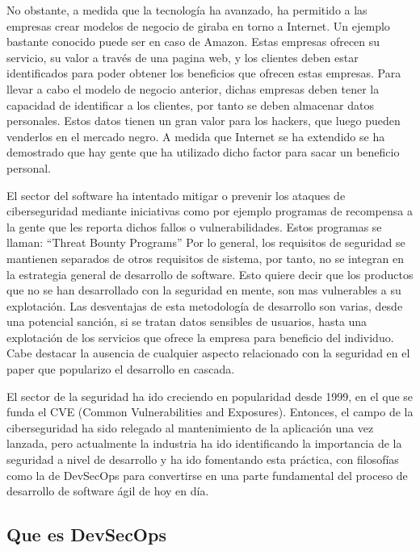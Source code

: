 \documentclass[12pt]{report} %
\begin{document}
No obstante, a medida que la tecnología ha avanzado, ha permitido a las empresas
crear modelos de negocio de giraba en torno a Internet.  Un ejemplo bastante
conocido puede ser en caso de Amazon.  Estas empresas ofrecen su servicio, su
valor a través de una pagina web, y los clientes deben estar identificados para
poder obtener los beneficios que ofrecen estas empresas.  Para llevar a cabo el
modelo de negocio anterior, dichas empresas deben tener la capacidad de
identificar a los clientes, por tanto se deben almacenar datos personales.
Estos datos tienen un gran valor para los hackers, que luego pueden venderlos en
el mercado negro.  A medida que Internet se ha extendido se ha demostrado que
hay gente que ha utilizado dicho factor para sacar un beneficio personal.

El sector del software ha intentado mitigar o prevenir los ataques de
ciberseguridad mediante iniciativas como por ejemplo programas de recompensa a
la gente que les reporta dichos fallos o vulnerabilidades.  Estos programas se
llaman: ``Threat Bounty Programs'' Por lo general, los requisitos de seguridad
se mantienen separados de otros requisitos de sistema, por tanto, no se integran
en la estrategia general de desarrollo de software. \cite{Flec2003} Esto quiere
decir que los productos que no se han desarrollado con la seguridad en mente,
son mas vulnerables a su explotación.  Las desventajas de esta metodología de
desarrollo son varias, desde una potencial sanción, si se tratan datos sensibles
de usuarios, hasta una explotación de los servicios que ofrece la empresa para
beneficio del individuo.  Cabe destacar la ausencia de cualquier aspecto
relacionado con la seguridad en el paper que popularizo el desarrollo en
cascada. \cite{royce1970}

El sector de la seguridad ha ido creciendo en popularidad desde 1999, en el que
se funda el CVE (Common Vulnerabilities and Exposures).  Entonces, el campo de
la ciberseguridad ha sido relegado al mantenimiento de la aplicación una vez
lanzada, pero actualmente la industria ha ido identificando la importancia de la
seguridad a nivel de desarrollo y ha ido fomentando esta práctica, con
filosofías como la de DevSecOps para convertirse en una parte fundamental del
proceso de desarrollo de software ágil de hoy en día.

\subsection{Que es DevSecOps}
\end{document}
